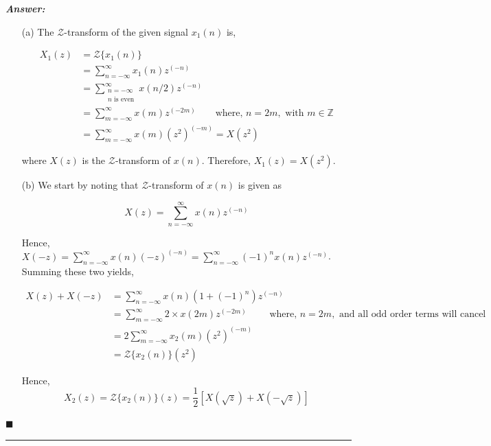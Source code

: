 \documentclass[12pt]{article}
\theoremstyle{definition}
\newenvironment{answer}{
    \textbf{\textit{Answer:}} \qquad
}{\hfill $\blacksquare$ \\ 

\begin{center}
    \rule{0.8\linewidth}{1.5px} 
    \vspace*{1cm}   
\end{center}
}
\newcommand{\Z}{\mathbb{Z}}
\newcommand{\zcal}{\mathcal{Z}}
\newcommand{\inv}[1][1]{^{(- #1)}}
\begin{document}
\begin{answer}
    \begin{enumerate}
        \item[(a)] The $\zcal$-transform of the given signal $x_1(n)$ is,
        
        \begin{align*}
            X_1(z) 
            & = \zcal\{ x_1(n) \}\\
            & = \sum_{n = -\infty}^\infty x_1(n)z\inv[n]\\
            & = \sum_{\substack{n = -\infty\\ n \text{ is even}}}^\infty x(n/2) z\inv[n]\\
            & = \sum_{m = -\infty}^\infty x(m) z\inv[2m] \qquad \text{where, } n = 2m, \text{ with } m \in \Z\\
            & = \sum_{m = -\infty}^\infty x(m) (z^2)\inv[m]
            = X(z^2)
        \end{align*}

        where $X(z)$ is the $\zcal$-transform of $x(n)$. Therefore, $X_1(z) = X(z^2)$.

        \item[(b)] We start by noting that $\zcal$-transform of $x(n)$ is given as
        
        $$
        X(z) = \sum_{n = -\infty}^{\infty} x(n)z\inv[n]
        $$

        Hence, $X(-z) = \sum_{n = -\infty}^{\infty} x(n)(-z)\inv[n] = \sum_{n = -\infty}^{\infty} (-1)^n x(n)z\inv[n]$. Summing these two yields,

        \begin{align*}
            X(z) + X(-z)
            & = \sum_{n = -\infty}^{\infty} x(n) (1 + (-1)^n) z\inv[n]\\
            & = \sum_{m = -\infty}^{\infty} 2 \times x(2m) z\inv[2m] \qquad \text{ where, } n = 2m, \text{ and all odd order terms will cancel}\\
            & = 2 \sum_{m = -\infty}^{\infty} x_2(m) (z^2)\inv[m]\\
            & = \zcal\{ x_2(n) \} (z^2)
        \end{align*}

        Hence,
        $$
        X_2(z) = \zcal\{ x_2(n) \}(z) = \dfrac{1}{2} \left[X(\sqrt{z}) + X(-\sqrt{z}) \right]
        $$

    \end{enumerate}
\end{answer}
\end{document}
